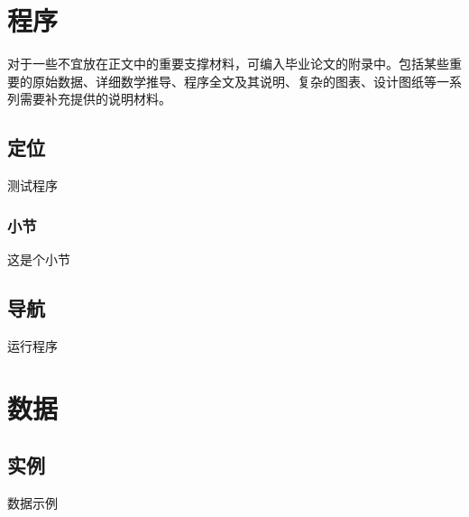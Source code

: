 \clearpage
\appendix

\chapter{程序}
\thispagestyle{fancy}
对于一些不宜放在正文中的重要支撑材料，可编入毕业论文的附录中。包括某些重要的原始数据、详细数学推导、程序全文及其说明、复杂的图表、设计图纸等一系列需要补充提供的说明材料。
\section{定位}
测试程序
\subsection{小节}
这是个小节
\section{导航}
运行程序

\chapter{数据}
\thispagestyle{fancy}
\section{实例}
数据示例